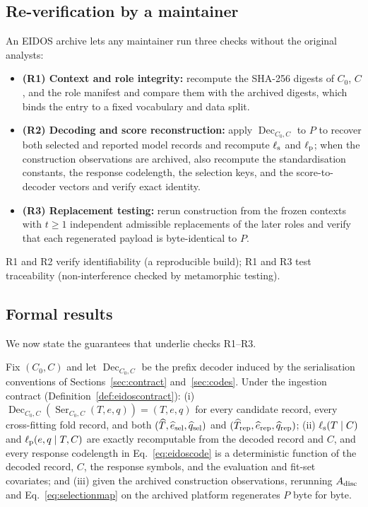 \subsection{Re-verification by a maintainer}\label{sec:reverify}

An EIDOS archive lets any maintainer run three checks without the original analysts:
\begin{itemize}
\item \textbf{(R1) Context and role integrity:} recompute the SHA-256 digests of \(C_0\), \(C\), and the role manifest and compare them with the archived digests, which binds the entry to a fixed vocabulary and data split.
\item \textbf{(R2) Decoding and score reconstruction:} apply \(\operatorname{Dec}_{C_0,C}\) to \(P\) to recover both selected and reported model records and recompute \(\ell_{\rm s}\) and \(\ell_{\rm p}\); when the construction observations are archived, also recompute the standardisation constants, the response codelength, the selection keys, and the score-to-decoder vectors and verify exact identity.
\item \textbf{(R3) Replacement testing:} rerun construction from the frozen contexts with \(t\ge1\) independent admissible replacements of the later roles and verify that each regenerated payload is byte-identical to \(P\).
\end{itemize}
R1 and R2 verify identifiability (a reproducible build); R1 and R3 test traceability (non-interference checked by metamorphic testing).

\subsection{Formal results}\label{sec:formal}

We now state the guarantees that underlie checks R1--R3.

\begin{proposition}\label{prop:reconstruction}
Fix \((C_0,C)\) and let \(\operatorname{Dec}_{C_0,C}\) be the prefix decoder induced by the serialisation conventions of Sections~\ref{sec:contract} and~\ref{sec:codes}. Under the ingestion contract (Definition~\ref{def:eidoscontract}): (i) \(\operatorname{Dec}_{C_0,C}(\operatorname{Ser}_{C_0,C}(T,e,q))=(T,e,q)\) for every candidate record, every cross-fitting fold record, and both \((\widehat T,\widehat e_{\rm sel},\widehat q_{\rm sel})\) and \((\widehat T_{\rm rep},\widehat e_{\rm rep},\widehat q_{\rm rep})\); (ii) \(\ell_{\rm s}(T\mid C)\) and \(\ell_{\rm p}(e,q\mid T,C)\) are exactly recomputable from the decoded record and \(C\), and every response codelength in Eq.~\eqref{eq:eidoscode} is a deterministic function of the decoded record, \(C\), the response symbols, and the evaluation and fit-set covariates; and (iii) given the archived construction observations, rerunning \(A_{\rm disc}\) and Eq.~\eqref{eq:selectionmap} on the archived platform regenerates \(P\) byte for byte.
\end{proposition}

